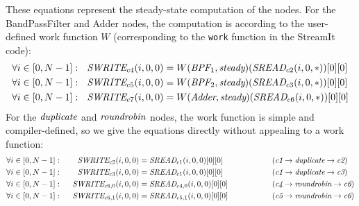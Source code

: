 These equations represent the steady-state computation of the nodes.
For the BandPassFilter and Adder nodes, the computation is according
to the user-defined work function $W$ (corresponding to the {\tt work}
function in the StreamIt code):
\begin{align*}
\forall i \in [0, N-1]:~~\mbox{\it SWRITE}_{c4}(i,0,0) &= W(\mbox{\it BPF}_1, \mbox{\it steady})(\mbox{\it SREAD}_{c2}(i, 0, *))[0][0] \\
\forall i \in [0, N-1]:~~\mbox{\it SWRITE}_{c5}(i,0,0) &= W(\mbox{\it BPF}_2, \mbox{\it steady})(\mbox{\it SREAD}_{c3}(i, 0, *))[0][0] \\
\forall i \in [0, N-1]:~~\mbox{\it SWRITE}_{c7}(i,0,0) &= W(\mbox{\it Adder}, \mbox{\it steady})(\mbox{\it SREAD}_{c6}(i, 0, *))[0][0]
\end{align*}
For the $\mbox{\it duplicate}$ and $\mbox{\it roundrobin}$ nodes, the work
function is simple and compiler-defined, so we give the equations
directly without appealing to a work function:
\begin{align*}
\forall i \in [0, N-1]:&& ~~\mbox{\it SWRITE}_{c2}(i,0,0) &= \mbox{\it SREAD}_{c1}(i, 0, 0)[0][0] &&~~~~~~~~~~~~~~ (\mbox{\it c1} \rightarrow \mbox{\it duplicate} \rightarrow \mbox{\it c2}) \\
\forall i \in [0, N-1]:&& ~~\mbox{\it SWRITE}_{c3}(i,0,0) &= \mbox{\it SREAD}_{c1}(i, 0, 0)[0][0] &&~~~~~~~~~~~~~~ (\mbox{\it c1} \rightarrow \mbox{\it duplicate} \rightarrow \mbox{\it c3}) \\
\forall i \in [0, N-1]:&& ~~\mbox{\it SWRITE}_{{c6}, 0}(i,0,0) &= \mbox{\it SREAD}_{{c4}, 0}(i, 0, 0)[0][0]  &&~~~~~~~~~~~~~~ (\mbox{\it c4} \rightarrow \mbox{\it roundrobin} \rightarrow \mbox{\it c6}) \\
\forall i \in [0, N-1]:&& ~~\mbox{\it SWRITE}_{{c6}, 1}(i,0,0) &= \mbox{\it SREAD}_{{c5}, 1}(i, 0, 0)[0][0] &&~~~~~~~~~~~~~~ (\mbox{\it c5} \rightarrow \mbox{\it roundrobin} \rightarrow \mbox{\it c6}) 
\end{align*}


